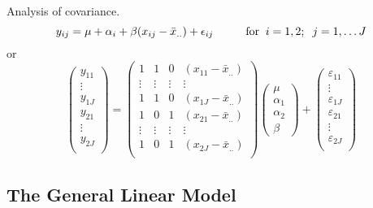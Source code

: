 \bexa
Analysis of covariance.
$$
y_{ij} = \mu + \alpha_i +  \beta (x_{ij} -\bar{x}_{..}) +  \epsilon_{ij}  \hskip1cm {\mbox{for}} \; \;  i = 1,2; \;\; j=1,\ldots J
$$
or
$$
\left( \begin{array}{c}
y_{11} \\ \vdots \\ y_{1J} \\
y_{21} \\ \vdots \\ y_{2J} \\
\end{array} \right) =
\left( \begin{array}{ccccc}
1     &    1   &   0  & (x_{11}-\bar{x}_{..})\\ 
\vdots& \vdots &\vdots&\vdots\\ 
1     &    1   &   0  & (x_{1J}-\bar{x}_{..})\\
1     &    0   &   1  & (x_{21}-\bar{x}_{..})\\ 
\vdots& \vdots &\vdots&\vdots\\ 
1     &    0   &   1  & (x_{2J}-\bar{x}_{..})\\ 
\end{array} \right)
\left( \begin{array}{c} \mu\\ \alpha_1 \\ \alpha_2 \\ \beta \end{array} \right) +
\left( \begin{array}{c}
\varepsilon_{11} \\ \vdots \\ \varepsilon_{1J} \\
\varepsilon_{21} \\ \vdots \\ \varepsilon_{2J} \\
\end{array} \right) 
$$
\eexa

\vb
\subsection{The General Linear Model}

